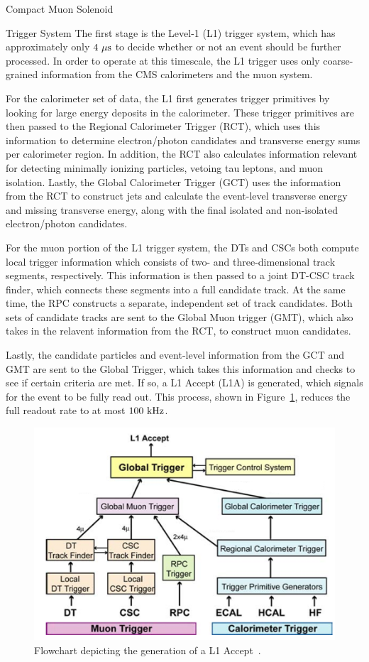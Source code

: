 \begin{section}{Compact Muon Solenoid}
\begin{subsection}{Trigger System}
The first stage is the Level-1 (L1) trigger system, which has approximately only $4~\mu\mathrm{s}$ to decide whether or not an event should be further processed. 
In order to operate at this timescale, the L1 trigger uses only coarse-grained information from the CMS calorimeters and the muon system.

For the calorimeter set of data, the L1 first generates trigger primitives by looking for large energy deposits in the calorimeter.
These trigger primitives are then passed to the Regional Calorimeter Trigger (RCT), which uses this information to determine electron/photon candidates and transverse energy sums per calorimeter region.
In addition, the RCT also calculates information relevant for detecting minimally ionizing particles, vetoing tau leptons, and muon isolation.
Lastly, the Global Calorimeter Trigger (GCT) uses the information from the RCT to construct jets and calculate the event-level transverse energy and missing transverse energy, along with the final isolated and non-isolated electron/photon candidates.

For the muon portion of the L1 trigger system, the DTs and CSCs both compute local trigger information which consists of two- and three-dimensional track segments, respectively.
This information is then passed to a joint DT-CSC track finder, which connects these segments into a full candidate track.
At the same time, the RPC constructs a separate, independent set of track candidates.
Both sets of candidate tracks are sent to the Global Muon trigger (GMT), which also takes in the relavent information from the RCT, to construct muon candidates.

Lastly, the candidate particles and event-level information from the GCT and GMT are sent to the Global Trigger, which takes this information and checks to see if certain criteria are met.
If so, a L1 Accept (L1A) is generated, which signals for the event to be fully read out.
This process, shown in Figure~\ref{fig:cms_trigger}, reduces the full readout rate to at most $100~\mathrm{kHz}$.

\begin{figure}[tbp!]
\begin{center}
\includegraphics[angle=0,width=0.80\columnwidth]{fig/cms_trigger.png}
\end{center}
\caption{Flowchart depicting the generation of a L1 Accept~\cite{Chatrchyan:2008aa}.}
\label{fig:cms_trigger}
\end{figure}


\end{subsection}
\end{section}
